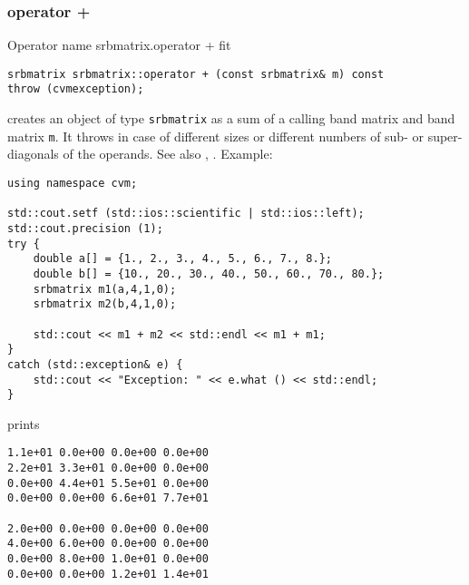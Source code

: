 \subsubsection{operator +}
Operator%
\pdfdest name {srbmatrix.operator +} fit
\begin{verbatim}
srbmatrix srbmatrix::operator + (const srbmatrix& m) const
throw (cvmexception);
\end{verbatim}
creates an object of type \verb"srbmatrix" as a sum of
a calling band matrix and  band matrix \verb"m".
It throws  
in case of different sizes or different numbers of sub- or super-diagonals
of the operands.
See also , .
Example:
\begin{Verbatim}
using namespace cvm;

std::cout.setf (std::ios::scientific | std::ios::left); 
std::cout.precision (1);
try {
    double a[] = {1., 2., 3., 4., 5., 6., 7., 8.};
    double b[] = {10., 20., 30., 40., 50., 60., 70., 80.};
    srbmatrix m1(a,4,1,0);
    srbmatrix m2(b,4,1,0);

    std::cout << m1 + m2 << std::endl << m1 + m1;
}
catch (std::exception& e) {
    std::cout << "Exception: " << e.what () << std::endl;
}
\end{Verbatim}
prints
\begin{Verbatim}
1.1e+01 0.0e+00 0.0e+00 0.0e+00
2.2e+01 3.3e+01 0.0e+00 0.0e+00
0.0e+00 4.4e+01 5.5e+01 0.0e+00
0.0e+00 0.0e+00 6.6e+01 7.7e+01

2.0e+00 0.0e+00 0.0e+00 0.0e+00
4.0e+00 6.0e+00 0.0e+00 0.0e+00
0.0e+00 8.0e+00 1.0e+01 0.0e+00
0.0e+00 0.0e+00 1.2e+01 1.4e+01
\end{Verbatim}
\newpage





